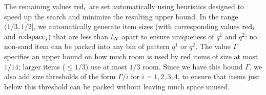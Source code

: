 \begin{table}[h]
	\caption{Parameters and item types used for \SonofH{}.}
	\label{tab:sonofharm}
	\centering
\end{table}

The remaining values $\mathrm{red}_i$ are set automatically  
using heuristics designed to speed up the search and minimize the
resulting upper bound. In the range $(1/3,1/2]$, we automatically
generate item sizes (with corresponding values $\mathrm{red}_i$ and $\mathrm{redspace}_i$) that are less than $t_N$ apart to ensure uniqueness of $q^1$
and $q^2$: no non-sand item can be packed into any bin of pattern $q^1$ or $q^2$. 
The value $\Gamma$ specifies an upper bound on how much room is used by
red items of size at most $1/14$; larger items ($\le1/3$) use at most $1/3$ room.
Since we have this bound $\Gamma$, we also add size thresholds of the form $\Gamma/i$ for $i=1,2,3,4$, to ensure that items just below this threshold can be packed without leaving much space unused.


